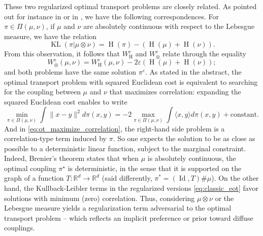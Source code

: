 \documentclass[]{article}
\DeclareMathOperator{\KL}{KL}
\DeclareMathOperator{\Id}{Id}
\DeclareMathOperator{\Hneg}{H}
\numberwithin{equation}{section}
\theoremstyle{plain}
\begin{document}
These two regularized optimal transport problems are closely related. As pointed out for instance in \cite[Lem.~1.5]{marino2020optimal} or in  \cite[Prop.~4.2]{peyre2019computational}, we have the following correspondences. For $\pi \in \Pi(\mu, \nu)$, if $\mu$ and $\nu$ are absolutely continuous with respect to the Lebesgue measure, we have the relation
    \begin{equation*}
        \KL(\pi | \mu \otimes \nu) = \Hneg(\pi) - (\Hneg(\mu) + \Hneg(\nu)).
    \end{equation*}
    From this observation, it follows that $W_{\Hneg}^{\varepsilon}$ and $W_\otimes^\varepsilon$ relate through the equality
    \begin{equation}
        W_\otimes^\varepsilon(\mu, \nu) = W_{\Hneg}^\varepsilon(\mu, \nu) - 2\varepsilon(\Hneg(\mu) + \Hneg(\nu));
    \end{equation}
and both problems have the same solution $\pi^\varepsilon$. As stated in the abstract, the optimal transport problem with squared Euclidean cost is equivalent to searching for the coupling between $\mu$ and $\nu$ that maximizes correlation: expanding the squared Euclidean cost enables to write
\begin{equation}\label{eq:ot_maximize_correlation}
    \min_{\pi \in \Pi(\mu, \nu)} \int\|x-y\|^2 d\pi(x,y) = -  2\max_{\pi \in  \Pi(\mu, \nu)} \int \langle x,y \rangle d\pi(x,y) +  \text{constant}. 
\end{equation}
And in \eqref{eq:ot_maximize_correlation}, the right-hand side problem is a correlation-type term induced by $\pi$. So one expects the solution to be as close as possible to a deterministic linear function, subject to the marginal constraint. Indeed, Brenier's theorem \cite{brenier1991polar} states that when $\mu$ is absolutely continuous, the optimal coupling $\pi^\star$ is deterministic, in the sense that it is supported on the graph of a function $T : \mathbb{R}^d \rightarrow \mathbb{R}^d$ (said differently, $\pi^* = (\Id,T)\#\mu$).
On the other hand, the Kullback-Leibler terms in the regularized versions \eqref{eq:classic_eot} favor solutions with minimum (zero) correlation. Thus, considering $\mu \otimes \nu$ or the Lebesgue measure yields a regularization term adversarial to the optimal transport problem -- which reflects an implicit preference or prior toward diffuse couplings. 
\end{document}
